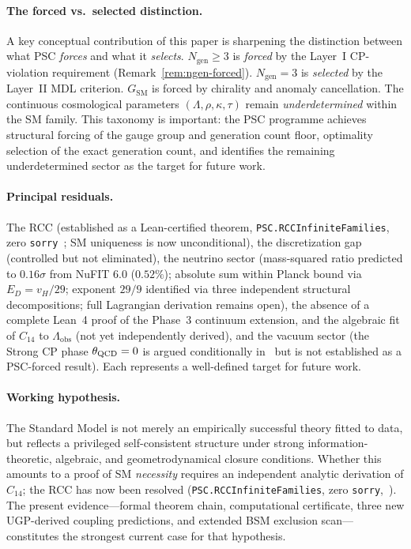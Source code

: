 \documentclass[11pt,twocolumn]{article}
\theoremstyle{remark}
\begin{document}
\paragraph{The forced vs.\ selected distinction.}
A key conceptual contribution of this paper is sharpening the
distinction between what PSC \emph{forces} and what it \emph{selects}.
$N_{\mathrm{gen}}\geq 3$ is \emph{forced} by the Layer~I
CP-violation requirement (Remark~\ref{rem:ngen-forced}).
$N_{\mathrm{gen}}=3$ is \emph{selected} by the Layer~II MDL criterion.
$G_{\mathrm{SM}}$ is forced by chirality and anomaly cancellation.
The continuous cosmological parameters $(\Lambda,\rho,\kappa,\tau)$
remain \emph{underdetermined} within the SM family.
This taxonomy is important: the PSC programme achieves structural
forcing of the gauge group and generation count floor, optimality
selection of the exact generation count, and identifies the remaining
underdetermined sector as the target for future work.

\paragraph{Principal residuals.}
The RCC (established as a Lean-certified theorem, \texttt{PSC.RCCInfiniteFamilies}, zero \texttt{sorry}~\cite{ugp-lean}; SM uniqueness is now unconditional), the discretization gap (controlled but not eliminated),
the neutrino sector (mass-squared ratio predicted to $0.16\sigma$ from NuFIT 6.0 ($0.52\%$); absolute sum within Planck bound via $E_D = v_H/29$; exponent $29/9$ identified via three independent structural decompositions; full Lagrangian derivation remains open), the absence of a complete Lean~4
proof of the Phase~3 continuum extension, and the algebraic fit of
$C_{14}$ to $\Lambda_{\mathrm{obs}}$ (not yet independently derived), and the vacuum sector (the Strong CP phase $\theta_{\rm QCD}=0$ is argued conditionally in~\cite{Spivack2026_SM_UGP} but is not established as a PSC-forced result).
Each represents a well-defined target for future work.

\paragraph{Working hypothesis.}
The Standard Model is not merely an empirically successful theory
fitted to data, but reflects a privileged self-consistent structure
under strong information-theoretic, algebraic, and geometrodynamical
closure conditions.
Whether this amounts to a proof of SM \emph{necessity} requires
an independent analytic derivation of $C_{14}$; the RCC has now been
resolved (\texttt{PSC.RCCInfiniteFamilies}, zero \texttt{sorry},~\cite{ugp-lean}).
The present evidence---formal theorem chain, computational certificate,
three new UGP-derived coupling predictions, and extended BSM exclusion
scan---constitutes the strongest current case for that hypothesis.
\end{document}

